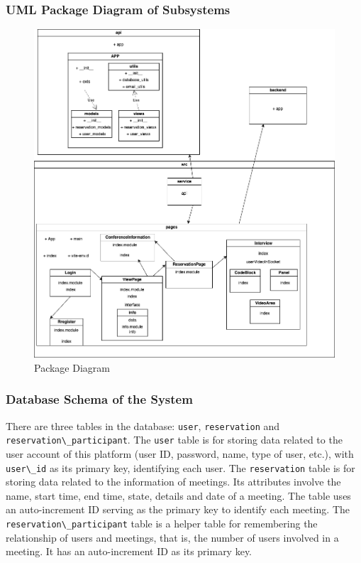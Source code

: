 \documentclass{article}
\begin{document}
\subsubsection*{UML Package Diagram of Subsystems}
\begin{figure}[H]
  \center
  \includegraphics[scale=0.3]{diagrams/package-diagram.png}
  \caption{Package Diagram}
\end{figure}

\subsubsection*{Database Schema of the System}
There are three tables in the database: \verb|user|, \verb|reservation| and \verb|reservation\_participant|. The \verb|user| table is for storing data related to the user account of this platform (user ID, password, name, type of user, etc.), with \verb|user\_id| as its primary key, identifying each user. The \verb|reservation| table is for storing data related to the information of meetings. Its attributes involve the name, start time, end time, state, details and date of a meeting. The table uses an auto-increment ID serving as the primary key to identify each meeting. The \verb|reservation\_participant| table is a helper table for remembering the relationship of users and meetings, that is, the number of users involved in a meeting. It has an auto-increment ID as its primary key.
\end{document}
